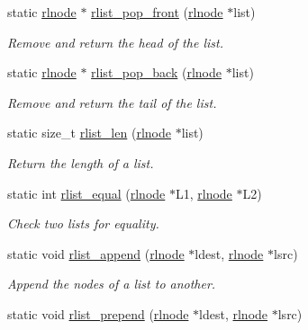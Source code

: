 \begin{DoxyCompactItemize}
static \hyperlink{group__rlists_ga8f6244877f7ce2322c90525217ea6e7a}{rlnode} $\ast$ \hyperlink{group__rlists_ga5cc2be48f94a7573fb8952356c6ba7d1}{rlist\+\_\+pop\+\_\+front} (\hyperlink{group__rlists_ga8f6244877f7ce2322c90525217ea6e7a}{rlnode} $\ast$list)
\begin{DoxyCompactList}\small\item\em Remove and return the head of the list. \end{DoxyCompactList}\item 
static \hyperlink{group__rlists_ga8f6244877f7ce2322c90525217ea6e7a}{rlnode} $\ast$ \hyperlink{group__rlists_ga55f998d5871e6e563b4320392995a6c5}{rlist\+\_\+pop\+\_\+back} (\hyperlink{group__rlists_ga8f6244877f7ce2322c90525217ea6e7a}{rlnode} $\ast$list)
\begin{DoxyCompactList}\small\item\em Remove and return the tail of the list. \end{DoxyCompactList}\item 
static size\+\_\+t \hyperlink{group__rlists_ga107b2689c5811f7dbab8f334812b46d0}{rlist\+\_\+len} (\hyperlink{group__rlists_ga8f6244877f7ce2322c90525217ea6e7a}{rlnode} $\ast$list)
\begin{DoxyCompactList}\small\item\em Return the length of a list. \end{DoxyCompactList}\item 
static int \hyperlink{group__rlists_gac02a33ca2f63b5dc5e9597a54da32cf4}{rlist\+\_\+equal} (\hyperlink{group__rlists_ga8f6244877f7ce2322c90525217ea6e7a}{rlnode} $\ast$L1, \hyperlink{group__rlists_ga8f6244877f7ce2322c90525217ea6e7a}{rlnode} $\ast$L2)
\begin{DoxyCompactList}\small\item\em Check two lists for equality. \end{DoxyCompactList}\item 
static void \hyperlink{group__rlists_ga7f5989d7ec35645d6bbb1c15cd438532}{rlist\+\_\+append} (\hyperlink{group__rlists_ga8f6244877f7ce2322c90525217ea6e7a}{rlnode} $\ast$ldest, \hyperlink{group__rlists_ga8f6244877f7ce2322c90525217ea6e7a}{rlnode} $\ast$lsrc)
\begin{DoxyCompactList}\small\item\em Append the nodes of a list to another. \end{DoxyCompactList}\item 
static void \hyperlink{group__rlists_ga906dea2f5a25116f979ba6585266453e}{rlist\+\_\+prepend} (\hyperlink{group__rlists_ga8f6244877f7ce2322c90525217ea6e7a}{rlnode} $\ast$ldest, \hyperlink{group__rlists_ga8f6244877f7ce2322c90525217ea6e7a}{rlnode} $\ast$lsrc)

\end{DoxyCompactItemize}
